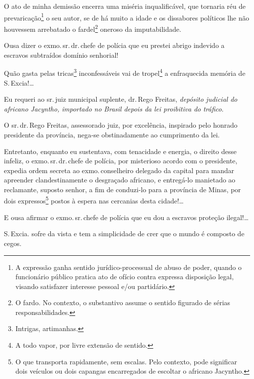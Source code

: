 O ato de minha demissão encerra uma miséria inqualificável, que tornaria
réu de prevaricação\footnote{A expressão ganha sentido
  jurídico-processual de abuso de poder, quando o funcionário público
  pratica ato de ofício contra expressa disposição legal, visando
  satisfazer interesse pessoal e/ou partidário.} o seu autor, se de há
muito a idade e os dissabores políticos lhe não houvessem arrebatado o
fardel\footnote{O fardo. No contexto, o substantivo assume o sentido
  figurado de sérias responsabilidades.} oneroso da imputabilidade.

Ousa dizer o exmo.\,sr.\,dr.\,chefe de polícia que eu prestei abrigo
indevido a escravos subtraídos domínio senhorial!

Quão gasta pelas tricas\footnote{Intrigas, artimanhas.} inconfessáveis
vai de tropel\footnote{A todo vapor, por livre extensão de sentido.} a
enfraquecida memória de S.\,Excia!\ldots{}

Eu requeri ao sr.\,juiz municipal suplente, dr.\,Rego Freitas,
\emph{depósito judicial do africano Jacyntho, importado no Brasil depois
da lei proibitiva do tráfico}.

O sr.\,dr.\,Rego Freitas, assessorado juiz, por excelência, inspirado pelo
honrado presidente da província, nega-se obstinadamente ao cumprimento
da lei.

Entretanto, enquanto eu sustentava, com tenacidade e energia, o direito
desse infeliz, o exmo.\,sr.\,dr.\,chefe de polícia, por misterioso acordo
com o presidente, expedia ordem secreta ao exmo.\,conselheiro delegado da
capital para mandar apreender clandestinamente o desgraçado africano, e
entregá-lo manietado ao reclamante, suposto senhor, a fim de conduzi-lo
para a província de Minas, por dois expressos\footnote{O que
  transporta rapidamente, sem escalas. Pelo contexto, pode significar
  dois veículos ou dois capangas encarregados de escoltar o africano
  Jacyntho.} postos à espera nas cercanias desta cidade!\ldots{}

E ousa afirmar o exmo.\,sr.\,chefe de polícia que eu dou a escravos
proteção ilegal!\ldots{}

S.\,Excia. sofre da vista e tem a simplicidade de crer que o mundo é
composto de cegos.

